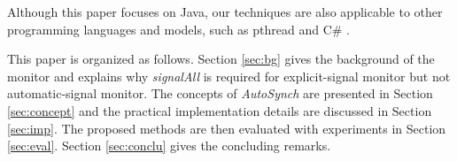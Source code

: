 \documentclass{sigplanconf}
\begin{document}


Although this paper 
focuses on Java, our techniques are also applicable to other programming 
languages and models, such as pthread and C\# \cite{hwg03}.


This paper is organized as follows. Section \ref{sec:bg} gives the background
of the monitor and explains why {\em signalAll} is required for
explicit-signal monitor but not automatic-signal monitor. The concepts of 
{\em AutoSynch} are presented in Section \ref{sec:concept} and the practical 
implementation details are discussed in Section  \ref{sec:imp}. The proposed 
methods are then evaluated with experiments in Section \ref{sec:eval}.  
Section \ref{sec:conclu} gives the concluding remarks.
\end{document}
